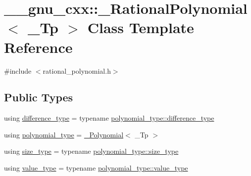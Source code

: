 \hypertarget{class____gnu__cxx_1_1__RationalPolynomial}{}\section{\+\_\+\+\_\+gnu\+\_\+cxx\+:\+:\+\_\+\+Rational\+Polynomial$<$ \+\_\+\+Tp $>$ Class Template Reference}
\label{class____gnu__cxx_1_1__RationalPolynomial}


{\ttfamily \#include $<$rational\+\_\+polynomial.\+h$>$}

\subsection*{Public Types}
\begin{DoxyCompactItemize}
\item 
using \hyperlink{class____gnu__cxx_1_1__RationalPolynomial_aa123f807ebadbf8b3948a77384ce8cb9}{difference\+\_\+type} = typename \hyperlink{class____gnu__cxx_1_1__Polynomial_aefb6d7ae1935b99a332d5b96b1e82d32}{polynomial\+\_\+type\+::difference\+\_\+type}
\item 
using \hyperlink{class____gnu__cxx_1_1__RationalPolynomial_a96949c9007664fae9fef1e26cf6c2078}{polynomial\+\_\+type} = \hyperlink{class____gnu__cxx_1_1__Polynomial}{\+\_\+\+Polynomial}$<$ \+\_\+\+Tp $>$
\item 
using \hyperlink{class____gnu__cxx_1_1__RationalPolynomial_aaba2b07e6b5f33be46c30b5d0eac6da4}{size\+\_\+type} = typename \hyperlink{class____gnu__cxx_1_1__Polynomial_a6afe219c123c7a2fdc5abac8a6639053}{polynomial\+\_\+type\+::size\+\_\+type}
\item 
using \hyperlink{class____gnu__cxx_1_1__RationalPolynomial_adeec7f1bec03111031599f337848ee8b}{value\+\_\+type} = typename \hyperlink{class____gnu__cxx_1_1__Polynomial_a725563351f50e76084a7a016c06f8a53}{polynomial\+\_\+type\+::value\+\_\+type}
\end{DoxyCompactItemize}
